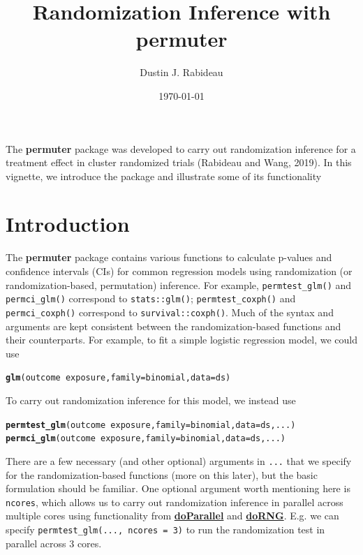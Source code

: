\documentclass[12pt]{article}\usepackage[]{graphicx}\usepackage[]{color}
\title{Randomization Inference with \textbf{permuter}}
\author{Dustin J. Rabideau}
\date{\today}
\makeatletter
\newcommand{\hlopt}[1]{\textcolor[rgb]{0,0,0}{#1}}%
\newcommand{\hlstd}[1]{\textcolor[rgb]{0.345,0.345,0.345}{#1}}%
\newcommand{\hlkwc}[1]{\textcolor[rgb]{0.333,0.667,0.333}{#1}}%
\newcommand{\hlkwd}[1]{\textcolor[rgb]{0.737,0.353,0.396}{\textbf{#1}}}%
\newenvironment{kframe}{%
 \def\at@end@of@kframe{}%
 \ifinner\ifhmode%
  \def\at@end@of@kframe{\end{minipage}}%
  \begin{minipage}{\columnwidth}%
 \fi\fi%
 \def\FrameCommand##1{\hskip\@totalleftmargin \hskip-\fboxsep
 \colorbox{shadecolor}{##1}\hskip-\fboxsep
     \hskip-\linewidth \hskip-\@totalleftmargin \hskip\columnwidth}%
 \MakeFramed {\advance\hsize-\width
   \@totalleftmargin\z@ \linewidth\hsize
   \@setminipage}}%
 {\par\unskip\endMakeFramed%
 \at@end@of@kframe}
\newenvironment{knitrout}{}{} %
\makeatother
\begin{document}
\maketitle

The \textbf{permuter} package was developed to carry out randomization inference for a treatment effect in cluster randomized trials (Rabideau and Wang, 2019). In this vignette, we introduce the package and illustrate some of its functionality

\section{Introduction}
The \textbf{permuter} package contains various functions to calculate p-values and confidence intervals (CIs) for common regression models using randomization (or randomization-based, permutation) inference. For example, \texttt{permtest\_glm()} and \texttt{permci\_glm()} correspond to \texttt{stats::glm()}; \texttt{permtest\_coxph()} and \texttt{permci\_coxph()} correspond to \texttt{survival::coxph()}. Much of the syntax and arguments are kept consistent between the randomization-based functions and their counterparts. For example, to fit a simple logistic regression model, we could use
\begin{knitrout}
\color{fgcolor}\begin{kframe}
\begin{alltt}
\hlkwd{glm}\hlstd{(outcome} \hlopt{~} \hlstd{exposure,} \hlkwc{family} \hlstd{= binomial,} \hlkwc{data} \hlstd{= ds)}
\end{alltt}
\end{kframe}
\end{knitrout}
To carry out randomization inference for this model, we instead use
\begin{knitrout}
\color{fgcolor}\begin{kframe}
\begin{alltt}
\hlkwd{permtest_glm}\hlstd{(outcome} \hlopt{~} \hlstd{exposure,} \hlkwc{family} \hlstd{= binomial,} \hlkwc{data} \hlstd{= ds, ...)}
\hlkwd{permci_glm}\hlstd{(outcome} \hlopt{~} \hlstd{exposure,} \hlkwc{family} \hlstd{= binomial,} \hlkwc{data} \hlstd{= ds, ...)}
\end{alltt}
\end{kframe}
\end{knitrout}
There are a few necessary (and other optional) arguments in \texttt{...} that we specify for the randomization-based functions (more on this later), but the basic formulation should be familiar. One optional argument worth mentioning here is \texttt{ncores}, which allows us to carry out randomization inference in parallel across multiple cores using functionality from \href{https://cran.r-project.org/web/packages/doParallel/index.html}{\textbf{doParallel}} and \href{https://cran.r-project.org/web/packages/doRNG/index.html}{\textbf{doRNG}}. E.g. we can specify \texttt{permtest\_glm(..., ncores = 3)} to run the randomization test in parallel across 3 cores.
\end{document}
